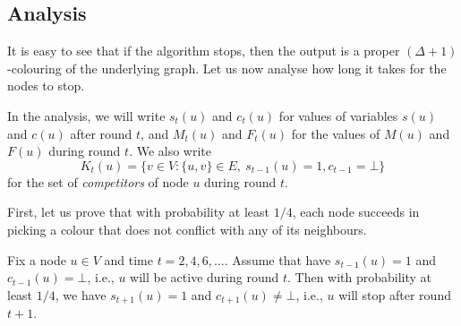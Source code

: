 \subsection{Analysis}

It is easy to see that if the algorithm stops, then the output is a proper ${(\Delta+1)}$-colouring of the underlying graph. Let us now analyse how long it takes for the nodes to stop.

In the analysis, we will write $s_t(u)$ and $c_t(u)$ for values of variables $s(u)$ and $c(u)$ after round $t$, and $M_t(u)$ and $F_t(u)$ for the values of $M(u)$ and $F(u)$ during round $t$. We also write
\[
    K_t(u) = \bigl\{ v \in V : \{u,v\} \in E,\ s_{t-1}(u) = 1, c_{t-1} = \bot \bigr\}
\]
for the set of \emph{competitors} of node $u$ during round $t$.

First, let us prove that with probability at least $1/4$, each node succeeds in picking a colour that does not conflict with any of its neighbours.
\begin{lemma}\label{lem:bdrand-onestep}
    Fix a node $u \in V$ and time $t = 2,4,6,\dotsc$. Assume that have $s_{t-1}(u) = 1$ and $c_{t-1}(u) = \bot$, i.e., $u$ will be active during round $t$. Then with probability at least $1/4$, we have $s_{t+1}(u) = 1$ and $c_{t+1}(u) \ne \bot$, i.e., $u$ will stop after round $t+1$.
\end{lemma}
